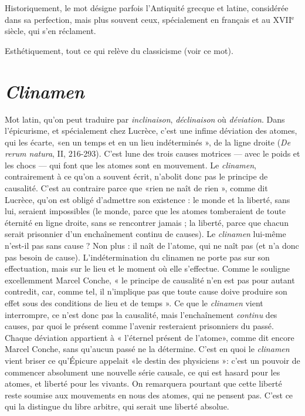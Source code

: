 Historiquement, le mot désigne parfois l’Antiquité grecque et latine, considérée
dans sa perfection, mais plus souvent ceux, spécialement en français et au
{\footnotesize XVII$^\text{e}$} siècle, qui s’en réclament.

Esthétiquement, tout ce qui relève du classicisme (voir ce mot).

\section{\it Clinamen}
Mot latin, qu’on peut traduire par {\it inclinaison}, {\it déclinaison} où
{\it déviation}. Dans l’épicurisme, et spécialement chez Lucrèce,
c’est une infime déviation des atomes, qui les écarte, «en un temps et en un
lieu indéterminés », de la ligne droite ({\it De rerum natura}, II, 216-293). C’est
lune des trois causes motrices — avec le poids et les chocs — qui font que les
atomes sont en mouvement. Le {\it clinamen}, contrairement à ce qu’on a souvent
écrit, n’abolit donc pas le principe de causalité. C’est au contraire parce que
«rien ne naît de rien », comme dit Lucrèce, qu’on est obligé d'admettre son
existence : le monde et la liberté, sans lui, seraient impossibles (le monde, parce
que les atomes tomberaient de toute éternité en ligne droite, sans se rencontrer
jamais ; la liberté, parce que chacun serait prisonnier d’un enchaînement
continu de causes). Le {\it clinamen} lui-même n'est-il pas sans cause ? Non plus : il
naît de l'atome, qui ne naît pas (et n’a donc pas besoin de cause). L’indétermination
du clinamen ne porte pas sur son effectuation, mais sur le lieu et le
moment où elle s’effectue. Comme le souligne excellemment Marcel Conche,
« le principe de causalité n’en est pas pour autant contredit, car, comme tel, il
n'implique pas que toute cause doive produire son effet sous des conditions de
lieu et de temps ». Ce que le {\it clinamen} vient interrompre, ce n’est donc pas la
causalité, mais l’enchaînement {\it continu} des causes, par quoi le présent comme
l'avenir resteraient prisonniers du passé. Chaque déviation appartient à
« l'éternel présent de l'atome», comme dit encore Marcel Conche, sans
qu'aucun passé ne la détermine. C’est en quoi le {\it clinamen} vient briser ce
qu’Épicure appelait «le destin des physiciens »: c’est un pouvoir de commencer
absolument une nouvelle série causale, ce qui est hasard pour les
atomes, et liberté pour les vivants. On remarquera pourtant que cette liberté
reste soumise aux mouvements en nous des atomes, qui ne pensent pas. C’est
ce qui la distingue du libre arbitre, qui serait une liberté absolue.

